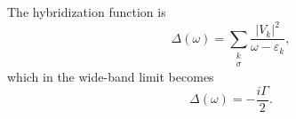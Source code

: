 \documentclass{article}
\begin{document}
The hybridization function is
\begin{equation}
\Delta(\omega) = \sum_{\substack{k \\ \sigma}} \frac{|V_{k}|^2}{\omega - \varepsilon_{k}} ,
\label{eq:hyb}
\end{equation}
which in the wide-band limit becomes
\begin{equation}
\Delta(\omega) = -\frac{i\Gamma}{2} .
\label{eq:wbl}
\end{equation}
\end{document}
